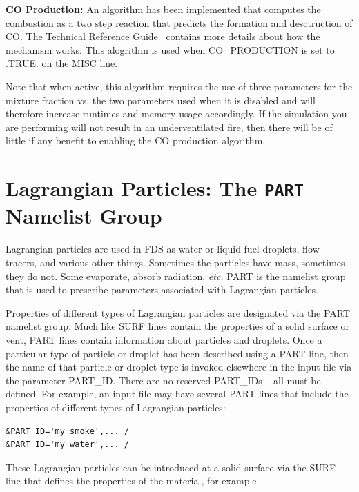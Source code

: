 \documentclass[11pt]{book}
\begin{document}
\vspace{\baselineskip}
\noindent
{\bf CO Production:}
An algorithm has been implemented that computes the combustion as a two step reaction that
predicts the formation and desctruction of CO.  The Technical Reference Guide~\cite{FDS_Tech_Guide_5}
contains more details about how the mechanism works. This alogrithm is used when
{\ct CO\_PRODUCTION} is set to {\ct .TRUE.} on the {\ct MISC} line.

\begin{warning}
\noindent
Note that when active, this algorithm requires the use of three parameters
for the mixture fraction vs. the two parameters used when it is disabled and will therefore
increase runtimes and memory usage accordingly.  If the simulation you are
performing will not result in an underventilated fire, then there will be of
little if any benefit to enabling the CO production algorithm.
\end{warning}

\clearpage
\section{Lagrangian Particles: The \texorpdfstring{{\tt PART}}{PART} Namelist Group}
\label{info:PART}

Lagrangian particles are used in FDS as water or liquid fuel
droplets, flow tracers, and various other things. Sometimes the
particles have mass, sometimes they do not. Some evaporate,
absorb radiation, {\em etc.}
{\ct PART} is the namelist group that is used to prescribe
parameters associated with Lagrangian particles.

Properties of different types of
Lagrangian particles are designated via the {\ct PART} namelist group.
Much like {\ct SURF} lines contain the properties of a solid surface or
vent, {\ct PART} lines contain information about particles and droplets.
Once a particular type of particle or droplet has been described using
a {\ct PART} line, then the name of that particle or droplet type is invoked
elsewhere in the input file via the parameter {\ct PART\_ID}. There are no reserved {\ct PART\_ID}s -- all must be defined.
For example, an input file may have several {\ct PART} lines that include the
properties of different types of Lagrangian particles:

\footnotesize
\begin{verbatim}
&PART ID='my smoke',... /
&PART ID='my water',... /
\end{verbatim}
\normalsize
These Lagrangian particles can be introduced at a solid surface via the {\ct SURF} line
that defines the properties of the material, for example
\end{document}
